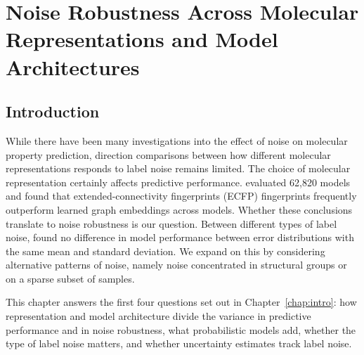 \chapter{Noise Robustness Across Molecular Representations and Model Architectures}\label{chap:robustness}


\section{Introduction}


While there have been many investigations into the effect of noise on molecular property prediction, direction comparisons between how different molecular representations responds to label noise remains limited. The choice of molecular representation certainly affects predictive performance. \citet{Deng2023} evaluated 62,820 models and found that extended-connectivity fingerprints (ECFP) fingerprints frequently outperform learned graph embeddings across models. Whether these conclusions translate to noise robustness is our question. Between different types of label noise, \citet{Heid2023} found no difference in model performance between error distributions with the same mean and standard deviation. We expand on this by considering alternative patterns of noise, namely noise concentrated in structural groups or on a sparse subset of samples.

This chapter answers the first four questions set out in Chapter~\ref{chap:intro}: how representation and model architecture divide the variance in predictive performance and in noise robustness, what probabilistic models add, whether the type of label noise matters, and whether uncertainty estimates track label noise.

